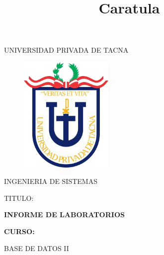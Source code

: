 \documentclass[12pt,letterpaper]{article}
\begin{document}
%


\title{Caratula}

\begin{titlepage}
\begin{center}
\large{UNIVERSIDAD PRIVADA DE TACNA}\\
\vspace*{-0.025in}
\begin{figure}[htb]
\begin{center}
\vspace{\baselineskip}
\includegraphics[width=4.5cm]{./Imagenes/logo}
\end{center}
\end{figure}
\vspace*{0.15in}
INGENIERIA DE SISTEMAS  \\

\vspace*{0.5in}
\begin{large}
TITULO:\\
\end{large}

\vspace*{0.1in}
\begin{Large}
\textbf{INFORME DE LABORATORIOS} \\
\end{Large}

\vspace*{0.3in}
\begin{Large}
\textbf{CURSO:} \\
\end{Large}

\vspace*{0.1in}
\begin{large}
BASE DE DATOS II\\
\end{large}


\end{center}
\end{titlepage}
\end{document}
